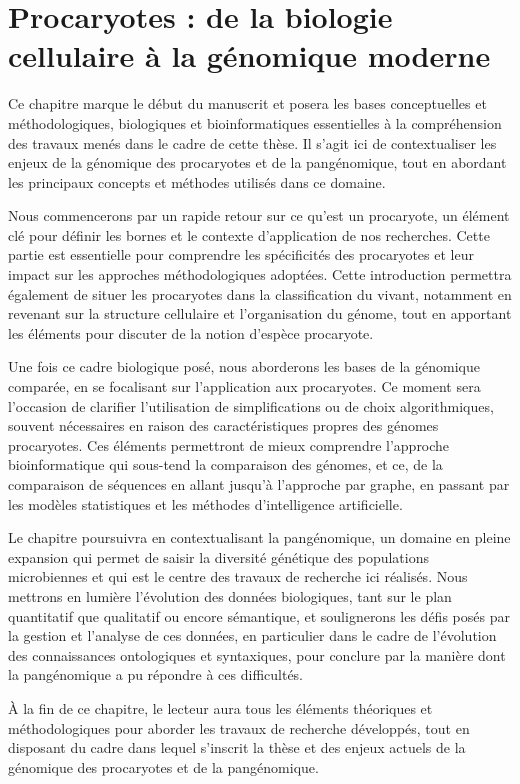 \part{Procaryotes : de la biologie cellulaire à la génomique moderne}

Ce chapitre marque le début du manuscrit et posera les bases conceptuelles et méthodologiques,  biologiques et bioinformatiques essentielles à la compréhension des travaux menés dans le cadre de cette thèse. Il s’agit ici de contextualiser les enjeux de la génomique des procaryotes et de la pangénomique, tout en abordant les principaux concepts et méthodes utilisés dans ce domaine.

Nous commencerons par un rapide retour sur ce qu'est un procaryote, un élément clé pour définir les bornes et le contexte d’application de nos recherches. Cette partie est essentielle pour comprendre les spécificités des procaryotes et leur impact sur les approches méthodologiques adoptées. Cette introduction permettra également de situer les procaryotes dans la classification du vivant, notamment en revenant sur la structure cellulaire et l'organisation du génome, tout en apportant les éléments pour discuter de la notion d'espèce procaryote.

Une fois ce cadre biologique posé, nous aborderons les bases de la génomique comparée, en se focalisant sur l'application aux procaryotes. Ce moment sera l’occasion de clarifier l’utilisation de simplifications ou de choix algorithmiques, souvent nécessaires en raison des caractéristiques propres des génomes procaryotes. Ces éléments permettront de mieux comprendre l’approche bioinformatique qui sous-tend la comparaison des génomes, et ce, de la comparaison de séquences en allant jusqu'à l'approche par graphe, en passant par les modèles statistiques et les méthodes d'intelligence artificielle.

Le chapitre poursuivra en contextualisant la pangénomique, un domaine en pleine expansion qui permet de saisir la diversité génétique des populations microbiennes et qui est le centre des travaux de recherche ici réalisés. Nous mettrons en lumière l’évolution des données biologiques, tant sur le plan quantitatif que qualitatif ou encore sémantique, et soulignerons les défis posés par la gestion et l’analyse de ces données, en particulier dans le cadre de l’évolution des connaissances ontologiques et syntaxiques, pour conclure par la manière dont la pangénomique a pu répondre à ces difficultés.  

À la fin de ce chapitre, le lecteur aura tous les éléments théoriques et méthodologiques pour aborder les travaux de recherche développés, tout en disposant du cadre dans lequel s'inscrit la thèse et des enjeux actuels de la génomique des procaryotes et de la pangénomique.

